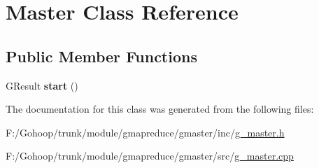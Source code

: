 \hypertarget{class_master}{\section{Master Class Reference}
\label{class_master}
}
\subsection*{Public Member Functions}
\begin{DoxyCompactItemize}
\item 
\hypertarget{class_master_a504ec6cdb9654955f5010301efff9a0d}{G\-Result {\bfseries start} ()}\label{class_master_a504ec6cdb9654955f5010301efff9a0d}

\end{DoxyCompactItemize}


The documentation for this class was generated from the following files\-:\begin{DoxyCompactItemize}
\item 
F\-:/\-Gohoop/trunk/module/gmapreduce/gmaster/inc/\hyperlink{g__master_8h}{g\-\_\-master.\-h}\item 
F\-:/\-Gohoop/trunk/module/gmapreduce/gmaster/src/\hyperlink{g__master_8cpp}{g\-\_\-master.\-cpp}\end{DoxyCompactItemize}
